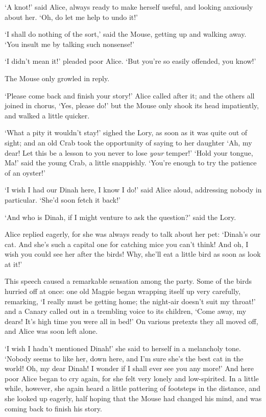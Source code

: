   `A knot!' said Alice, always ready to make herself useful, and
looking anxiously about her.  `Oh, do let me help to undo it!'

  `I shall do nothing of the sort,' said the Mouse, getting up
and walking away.  `You insult me by talking such nonsense!'

  `I didn't mean it!' pleaded poor Alice.  `But you're so easily
offended, you know!'

  The Mouse only growled in reply.

  `Please come back and finish your story!' Alice called after
it; and the others all joined in chorus, `Yes, please do!' but
the Mouse only shook its head impatiently, and walked a little
quicker.

  `What a pity it wouldn't stay!' sighed the Lory, as soon as it
was quite out of sight; and an old Crab took the opportunity of
saying to her daughter `Ah, my dear!  Let this be a lesson to you
never to lose {\it your} temper!'  `Hold your tongue, Ma!' said the
young Crab, a little snappishly.  `You're enough to try the
patience of an oyster!'

  `I wish I had our Dinah here, I know I do!' said Alice aloud,
addressing nobody in particular.  `She'd soon fetch it back!'

  `And who is Dinah, if I might venture to ask the question?'
said the Lory.

  Alice replied eagerly, for she was always ready to talk about
her pet:  `Dinah's our cat.  And she's such a capital one for
catching mice you can't think!  And oh, I wish you could see her
after the birds!  Why, she'll eat a little bird as soon as look
at it!'

  This speech caused a remarkable sensation among the party.
Some of the birds hurried off at once:  one old Magpie began
wrapping itself up very carefully, remarking, `I really must be
getting home; the night-air doesn't suit my throat!' and a Canary
called out in a trembling voice to its children, `Come away, my
dears!  It's high time you were all in bed!'  On various pretexts
they all moved off, and Alice was soon left alone.

  `I wish I hadn't mentioned Dinah!' she said to herself in a
melancholy tone.  `Nobody seems to like her, down here, and I'm
sure she's the best cat in the world!  Oh, my dear Dinah!  I
wonder if I shall ever see you any more!'  And here poor Alice
began to cry again, for she felt very lonely and low-spirited.
In a little while, however, she again heard a little pattering of
footsteps in the distance, and she looked up eagerly, half hoping
that the Mouse had changed his mind, and was coming back to
finish his story.



